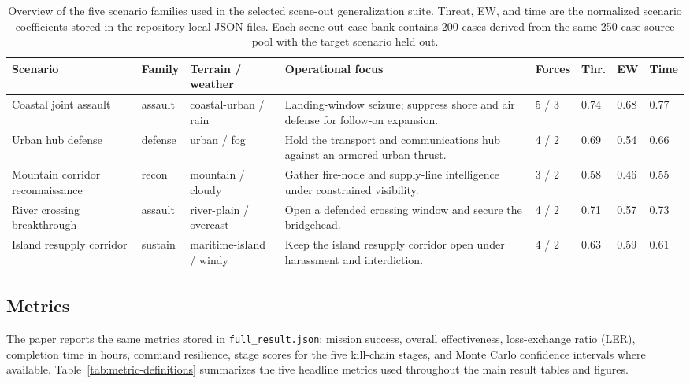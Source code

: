 \begin{table}[!t]
\centering
\caption{Overview of the five scenario families used in the selected scene-out generalization suite. Threat, EW, and time are the normalized scenario coefficients stored in the repository-local JSON files. Each scene-out case bank contains 200 cases derived from the same 250-case source pool with the target scenario held out.}
\label{tab:scenario-overview}
{\scriptsize
\setlength{\tabcolsep}{2.6pt}
\renewcommand{\arraystretch}{1.05}
\begin{tabularx}{\textwidth}{P{2.15cm}P{1.00cm}P{1.85cm}Y C{0.85cm}C{0.78cm}C{0.72cm}C{0.72cm}}
\toprule
Scenario & Family & Terrain / weather & Operational focus & Forces & Thr. & EW & Time \\
\midrule
Coastal joint assault & assault & coastal-urban / rain & Landing-window seizure; suppress shore and air defense for follow-on expansion. & 5 / 3 & 0.74 & 0.68 & 0.77 \\
Urban hub defense & defense & urban / fog & Hold the transport and communications hub against an armored urban thrust. & 4 / 2 & 0.69 & 0.54 & 0.66 \\
Mountain corridor reconnaissance & recon & mountain / cloudy & Gather fire-node and supply-line intelligence under constrained visibility. & 3 / 2 & 0.58 & 0.46 & 0.55 \\
River crossing breakthrough & assault & river-plain / overcast & Open a defended crossing window and secure the bridgehead. & 4 / 2 & 0.71 & 0.57 & 0.73 \\
Island resupply corridor & sustain & maritime-island / windy & Keep the island resupply corridor open under harassment and interdiction. & 4 / 2 & 0.63 & 0.59 & 0.61 \\
\bottomrule
\end{tabularx}
\par}
\end{table}

\subsection{Metrics}

The paper reports the same metrics stored in \texttt{full\_result.json}: mission success, overall effectiveness, loss-exchange ratio (LER), completion time in hours, command resilience, stage scores for the five kill-chain stages, and Monte Carlo confidence intervals where available. Table~\ref{tab:metric-definitions} summarizes the five headline metrics used throughout the main result tables and figures.


